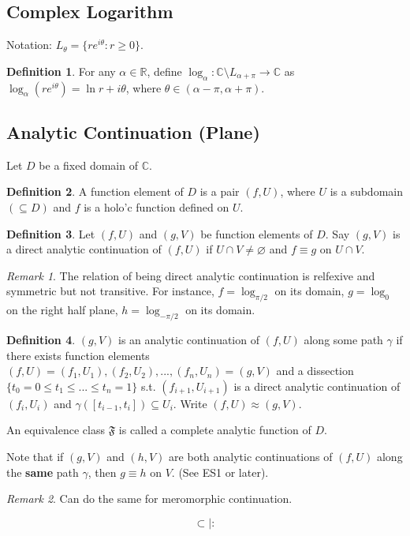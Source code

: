 \documentclass{article}
\theoremstyle{definition}
\newtheorem{defn}{Definition}[section]
\theoremstyle{remark}
\newtheorem{rem}{Remark}
\theoremstyle{plain}
\newcommand{\RR}{\mathbb{R}}
\newcommand{\CC}{\mathbb{C}}
\begin{document}
\subsection{Complex Logarithm}
Notation: $L_\theta=\{re^{i\theta}:r\ge 0\}$.
\begin{defn}
    For any $\alpha\in\RR$, define $\log_\alpha:\CC\setminus L_{\alpha+\pi}\to\CC$ as $\log_\alpha(re^{i\theta})=\ln r+i\theta$, where $\theta\in(\alpha-\pi,\alpha+\pi)$.
\end{defn}

\subsection{Analytic Continuation (Plane)}
Let $D$ be a fixed domain of $\CC$.
\begin{defn}
    A function element of $D$ is a pair $(f,U)$, where $U$ is a subdomain $(\subseteq D)$ and $f$ is a holo'c function defined on $U$.
\end{defn}
\begin{defn}
    Let $(f,U)$ and $(g,V)$ be function elements of $D$. Say $(g,V)$ is a direct analytic continuation of $(f,U)$ if $U\cap V\neq\varnothing$ and $f\equiv g$ on $U\cap V$.
\end{defn}
\begin{rem}
    The relation of being direct analytic continuation is relfexive and symmetric but not transitive. For instance, $f=\log_{\pi/2}$ on its domain, $g=\log_0$ on the right half plane, $h=\log_{-\pi/2}$ on its domain.
\end{rem}
\begin{defn}
    $(g,V)$ is an analytic continuation of $(f,U)$ along some path $\gamma$ if there exists function elements $(f, U)=(f_1,U_1), (f_2,U_2),...,(f_n,U_n)=(g,V)$ and a dissection $\{t_0=0\le t_1\le...\le t_n=1\}$ s.t. $(f_{i+1},U_{i+1})$ is a direct analytic continuation of $(f_i, U_i)$ and $\gamma([t_{i-1},t_i])\subseteq U_i$. Write $(f,U)\approx (g,V)$.

    An equivalence class $\mathfrak F$ is called a complete analytic function of $D$.
\end{defn}
Note that if $(g,V)$ and $(h,V)$ are both analytic continuations of $(f,U)$ along the \textbf{same} path $\gamma$, then $g\equiv h$ on $V$. (See ES1 or later).

\begin{rem}
    Can do the same for meromorphic continuation.
\end{rem}
\[\subset\vert:\tag{Owen's Signature}\]
\end{document}
